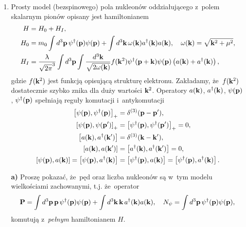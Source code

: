 \documentclass[a4paper,11pt]{article}
\begin{document}
\begin{enumerate}
\item Prosty model (bezspinowego) pola nukleonów oddziałującego
  z~polem skalarnym pionów opisany jest hamiltonianem
  \begin{align}
    H &= H_{ 0 } + H_{ I }, \\
    H_{ 0 }
      &=
        m_{ 0 } \int d^{ 3 }\mathbf{p} \, \psi^{ \dagger }( \mathbf{p} )
        \psi( \mathbf{p} )
        + \int d^{ 3 } \mathbf{k} \, \omega( \mathbf{k} ) a^{ \dagger }( \mathbf{k} )
        a( \mathbf{k} ),
        \quad
        \omega( \mathbf{k} ) = \sqrt{ \mathbf{k}^{ 2 } + \mu^{ 2 } }, \\
    H_{ I }
      &=
        \frac{ \uplambda }{ \sqrt{ 2\pi }^{ 3 } }
        \int d^{ 3 } \mathbf{p}
        \int \frac{ d^{ 3 } \mathbf{k} }{ \sqrt{ 2\omega( \mathbf{k} ) } }
        f( \mathbf{k}^{ 2 } ) \psi^{ \dagger }( \mathbf{p} + \mathbf{k} )
        \psi( \mathbf{p} )
        \left( a( \mathbf{k} ) + a^{ \dagger }( \mathbf{k} ) \right),
  \end{align}
  gdzie $f( \mathbf{k}^{ 2 } )$ jest funkcją opisującą strukturę
  elektronu. Zakładamy, że~$f( \mathbf{k}^{ 2 } )$ dostatecznie szybko
  znika dla duży wartości $\mathbf{k}^{ 2 }$. Operatory
  $a( \mathbf{k} )$, $a^{ \dagger }( \mathbf{k} )$, $\psi( \mathbf{p} )$,
  $\psi^{ \dagger }( \mathbf{p} )$ spełniają reguły komutacji i~antykomutacji
  \begin{align}
    \left[ \psi( \mathbf{p} ), \psi^{ \dagger }( \mathbf{p} ) \right]_{ + }
    &= \delta^{ ( 3 ) }( \mathbf{p} - \mathbf{p}' ), \\
    \left[ \psi( \mathbf{p} ), \psi( \mathbf{p}' ) \right]_{ + }
    &=
      \left[ \psi^{ \dagger }( \mathbf{p} ), \psi^{ \dagger }( \mathbf{p}' ) \right]_{ + }
      = 0, \\
    \left[ a( \mathbf{k} ), a^{ \dagger }( \mathbf{k}' ) \right]
    &= \delta^{ ( 3 ) }( \mathbf{k} - \mathbf{k}' ), \\
    \left[ a( \mathbf{k}), a( \mathbf{k}' ) \right]
    &=
      \left[ a^{ \dagger }( \mathbf{k} ), a^{ \dagger }( \mathbf{k}' ) \right] = 0, \\
    \left[ \psi( \mathbf{p} ), a( \mathbf{k} ) \right]
    = \left[ \psi( \mathbf{p} ), a^{ \dagger }( \mathbf{k} ) \right]
    &=
      \left[ \psi^{ \dagger }( \mathbf{p} ), a( \mathbf{k} ) \right]
      = \left[ \psi^{ \dagger }( \mathbf{p} ), a^{ \dagger }( \mathbf{k} ) \right].
  \end{align}

  \textbf{a)} Proszę pokazać, że~pęd oraz liczba nukleonów są w~tym
  modelu wielkościami zachowanymi, t.j. że~operator
  \begin{equation}
    \mathbf{P}
    =
    \int d^{ 3 } \mathbf{p} \, \mathbf{p} \, \psi^{ \dagger }( \mathbf{p} )
    \psi( \mathbf{p} )
    + \int d^{ 3 } \mathbf{k} \, \mathbf{k} \, a^{ \dagger }( \mathbf{k} )
    a( \mathbf{k} ), \quad
    N_{ \psi } = \int d^{ 3 } \mathbf{p} \, \psi^{ \dagger }( \mathbf{p} ) \psi( \mathbf{p} ),
  \end{equation}
  komutują z~\emph{pełnym} hamiltonianem $H$.


\end{enumerate}
\end{document}
